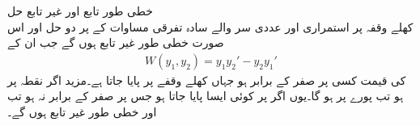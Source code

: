 \quad خطی طور تابع اور غیر تابع حل\\
کھلے وقفہ  پر استمراری   اور  عددی سر والے سادہ تفرقی  مساوات  کے   پر دو حل  اور  اس صورت خطی طور غیر تابع ہوں گے جب ان کے 
\begin{align}\label{مساوات_سادہ_دو_ورونسکی_تعریف}
W(y_1,y_2)=y_1y_2'-y_2y_1'
\end{align}
کی قیمت  کسی  پر صفر کے برابر ہو جہاں  کھلے وقفے  پر پایا جاتا ہے۔مزید اگر  نقطہ  پر  ہو تب پورے  پر  ہو گا۔یوں اگر  پر کوئی ایسا  پایا جاتا ہو جس پر  صفر کے برابر نہ ہو تب  اور  خطی طور غیر تابع ہوں گے۔
